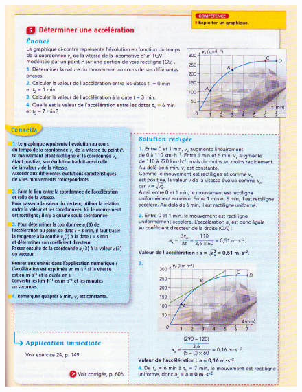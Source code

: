 \documentclass[11pt,a4paper]{article}
\begin{document}
\begin{figure}[h]
    \centering
    \includegraphics[width=\linewidth]{imgs/p1/xo3.jpg}
\end{figure}
\end{document}
